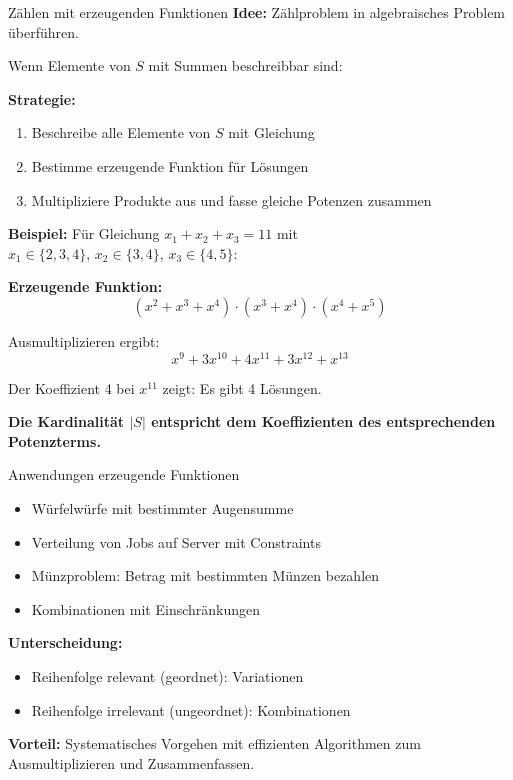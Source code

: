 \documentclass[a4paper, fontsize=7pt]{scrartcl}
\begin{document}
\begin{mainbox}{Zählen mit erzeugenden Funktionen}
\textbf{Idee:} Zählproblem in algebraisches Problem überführen.

Wenn Elemente von $S$ mit Summen beschreibbar sind:

\textbf{Strategie:}
\begin{enumerate}
    \item Beschreibe alle Elemente von $S$ mit Gleichung
    \item Bestimme erzeugende Funktion für Lösungen
    \item Multipliziere Produkte aus und fasse gleiche Potenzen zusammen
\end{enumerate}

\textbf{Beispiel:} Für Gleichung $x_1 + x_2 + x_3 = 11$ mit\\
$x_1 \in \{2,3,4\}$, $x_2 \in \{3,4\}$, $x_3 \in \{4,5\}$:

\textbf{Erzeugende Funktion:}
$$(x^2 + x^3 + x^4) \cdot (x^3 + x^4) \cdot (x^4 + x^5)$$

Ausmultiplizieren ergibt:
$$x^9 + 3x^{10} + 4x^{11} + 3x^{12} + x^{13}$$

Der Koeffizient 4 bei $x^{11}$ zeigt: Es gibt 4 Lösungen.

\textbf{Die Kardinalität $|S|$ entspricht dem Koeffizienten des entsprechenden Potenzterms.}
\end{mainbox}

\begin{subbox}{Anwendungen erzeugende Funktionen}
\begin{itemize}
    \item Würfelwürfe mit bestimmter Augensumme
    \item Verteilung von Jobs auf Server mit Constraints
    \item Münzproblem: Betrag mit bestimmten Münzen bezahlen
    \item Kombinationen mit Einschränkungen
\end{itemize}

\textbf{Unterscheidung:}
\begin{itemize}
    \item Reihenfolge relevant (geordnet): Variationen
    \item Reihenfolge irrelevant (ungeordnet): Kombinationen
\end{itemize}

\textbf{Vorteil:} Systematisches Vorgehen mit effizienten Algorithmen zum Ausmultiplizieren und Zusammenfassen.
\end{subbox}
\end{document}
